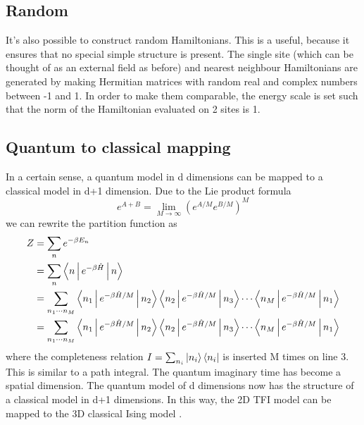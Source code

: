 \subsection{Random}\label{randhamexpl}
It's also possible to construct random Hamiltonians. This is a useful, because it ensures that no special simple structure is present. The single site (which can be thought of as an external field as before) and nearest neighbour Hamiltonians are generated by making Hermitian matrices with random real and complex numbers between -1 and 1. In order to make them comparable, the energy scale is set such that the norm of the Hamiltonian evaluated on 2 sites is 1.

\subsection{Quantum to classical mapping}\label{q2cmap}

In a certain sense, a quantum model in d dimensions can be mapped to a classical model in d+1 dimension. Due to the Lie product formula
\begin{equation}
  e^{A+B} = \lim_{M \to \infty } ( e^{A/M} e^{B/M}  )^M
\end{equation}
we can rewrite the partition function as
\begin{align}
  Z & = \sum_n e^{ - \beta E_n} \nonumber                                                                                                                                                       \\
    & = \sum_n \Braket{n | e^{ - \beta \hat{H} }  | n} \nonumber                                                                                                                                \\
    & = \sum_{n_1 \cdots n_M} \Braket{n_1 | e^{ - \beta \hat{H} /M}  | n_2}  \Braket{n_2 | e^{ - \beta \hat{H} /M }  | n_3} \cdots  \Braket{n_{M} | e^{ - \beta \hat{H} /M }  | n_1}  \nonumber \\
    & = \sum_{  n_1 \cdots n_M} \Braket{n_1 | e^{ - \beta \hat{H} /M}  | n_2}  \Braket{n_2 | e^{ - \beta \hat{H} /M }  | n_3} \cdots  \Braket{n_{M} | e^{ - \beta \hat{H} /M }  | n_1}          \\
\end{align}
where the completeness relation $ I = \sum_{n_i}  \ket{ n_i } \bra{ n_i}  $ is inserted M times on line 3. This is similar to a path integral. The quantum imaginary time has become a spatial dimension. The quantum model of d dimensions now has the structure of a classical model in d+1 dimensions. In this way, the 2D \Gls{TFI} model can be mapped to the 3D classical Ising model \cite{Hsieh}.